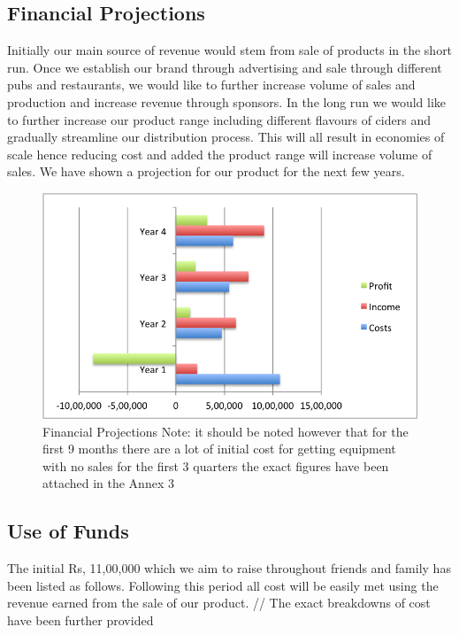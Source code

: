 \documentclass[11pt]{article}
\begin{document}
  \subsection{Financial Projections}
Initially our main source of revenue would stem from sale of products in the short run. Once we establish our brand through advertising and sale through different pubs and restaurants, we would like to further increase volume of sales and production and increase revenue through sponsors. In the long run we would like to further increase our product range including different flavours of ciders and gradually streamline our distribution process. This will all result in economies of scale hence reducing cost and added the product range will increase volume of sales. We have shown a projection for our product for the next few years.
	\begin{figure}[h!]
	\caption{Financial Projections \newline Note: it should be noted however that for the first 9 months there are a lot of initial cost for getting equipment with no sales for the first 3 quarters \newline the exact figures have been attached in the Annex 3}
	\centering
	\includegraphics[width=\textwidth]{financialProjections.png}
	\end{figure}


  \subsection{Use of Funds}
The initial Rs, 11,00,000 which we aim to raise throughout friends and family has been listed as follows.
Following this period all cost will be easily met using the revenue earned from the sale of our product. //
The exact breakdowns of cost have been further provided
\end{document}
